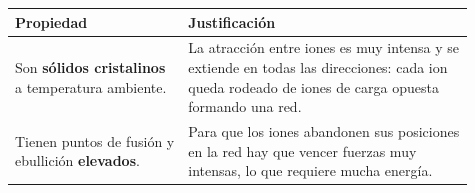 \begin{center}
    \begin{tabular}{@{}L{0.34\linewidth} L{0.57\linewidth}@{}}
        \toprule
        \textbf{Propiedad} & \textbf{Justificación} \\
        \midrule
        Son \textbf{sólidos cristalinos} a temperatura ambiente. & La atracción entre iones es muy intensa y se extiende en todas las direcciones: cada ion queda rodeado de iones de carga opuesta formando una red. \\[3pt]
        Tienen puntos de fusión y ebullición \textbf{elevados}. & Para que los iones abandonen sus posiciones en la red hay que vencer fuerzas muy intensas, lo que requiere mucha energía. \\[3pt]

\end{tabular}
\end{center}
